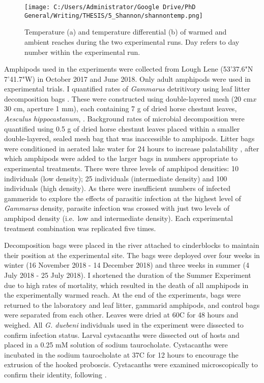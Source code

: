 \begin{figure}%
    \centering
    \texttt{[image: C:/Users/Administrator/Google Drive/PhD General/Writing/THESIS/5\_Shannon/shannontemp.png]}
  \caption [Temperature of the experimental sites in the River Shannon]{Temperature (a) and temperature differential (b) of warmed and ambient reaches during the two experimental runs. Day refers to day number within the experimental run.} 
    \label{fig:shannontemp}
\end{figure}

Amphipods used in the experiments were collected from Lough Lene (53'37.6"N 7'41.7"W) in October 2017 and June 2018. Only adult amphipods were used in experimental trials. I quantified rates of \emph{Gammarus} detritivory using leaf litter decomposition bags \citep{benfield2006}. These were constructed using double-layered mesh (20 cm$x$30 cm, aperture 1 mm), each containing 7 g of dried horse chestnut leaves, \emph{Aesculus hippocastanum}, \citep{agatz2014}. Background rates of microbial decomposition were quantified using 0.5 g of dried horse chestnut leaves placed within a smaller double-layered, sealed mesh bag that was inaccessible to amphipods. Litter bags were conditioned in aerated lake water for 24 hours to increase palatability \citep{graca1993, agatz2014}, after which amphipods were added to the larger bags in numbers appropriate to experimental treatments. There were three levels of amphipod densities: 10 individuals (low density); 25 individuals (intermediate density) and 100 individuals (high density). As there were insufficient numbers of infected gammerids to explore the effects of parasitic infection at the highest level of \emph{Gammarus} density, parasite infection was crossed with just two levels of amphipod density (i.e.\ low and intermediate density). Each experimental treatment combination was replicated five times.

Decomposition bags were placed in the river attached to cinderblocks to maintain their position at the experimental site. The bags were deployed over four weeks in winter (16 November 2018 - 14 December 2018) and three weeks in summer (4 July 2018 - 25 July 2018). I shortened the duration of the Summer Experiment due to high rates of mortality, which resulted in the death of all amphipods in the experimentally warmed reach. At the end of the experiments, bags were returned to the laboratory and leaf litter, gammarid amphipods, and control bags were separated from each other. Leaves were dried at 60\degree C for 48 hours and weighed. All \emph{G. duebeni} individuals used in the experiment were dissected to confirm infection status. Larval cystacanths were dissected out of hosts and placed in a 0.25 mM solution of sodium taurocholate. Cystacanths were incubated in the sodium taurocholate at 37\degree C for 12 hours to encourage the extrusion of the hooked proboscis. Cystacanths were examined microscopically to confirm their identity, following \citet{mcdonald1988}.


